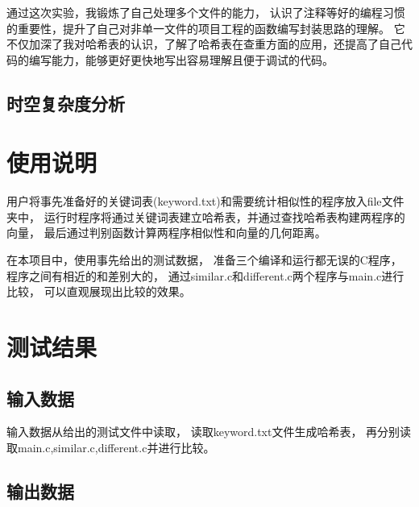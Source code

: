 \documentclass[a4paper]{article}
\begin{document}
	{{通过这次实验，我锻炼了自己处理多个文件的能力，
	认识了注释等好的编程习惯的重要性，提升了自己对非单一文件的项目工程的函数编写封装思路的理解。
	它不仅加深了我对哈希表的认识，了解了哈希表在查重方面的应用，还提高了自己代码的编写能力，能够更好更快地写出容易理解且便于调试的代码。}}

	\subsection{时空复杂度分析}\label{subsec:analysis2}


	\section{使用说明}\label{sec:instrut}
	{{用户将事先准备好的关键词表(keyword.txt)和需要统计相似性的程序放入file文件夹中，
	运行时程序将通过关键词表建立哈希表，并通过查找哈希表构建两程序的向量，
	最后通过判别函数计算两程序相似性和向量的几何距离。}}

	{{在本项目中，使用事先给出的测试数据，
	准备三个编译和运行都无误的C程序，程序之间有相近的和差别大的，
	通过similar.c和different.c两个程序与main.c进行比较，
	可以直观展现出比较的效果。}}


	\section{测试结果}\label{sec:result}

	\subsection{输入数据}\label{subsec:in}
	{{输入数据从给出的测试文件中读取，
	读取keyword.txt文件生成哈希表，
	再分别读取main.c,similar.c,different.c并进行比较。}}

	\subsection{输出数据}\label{subsec:out}






\end{document}
